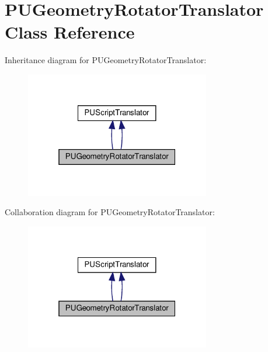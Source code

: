 \hypertarget{classPUGeometryRotatorTranslator}{}\section{P\+U\+Geometry\+Rotator\+Translator Class Reference}
\label{classPUGeometryRotatorTranslator}


Inheritance diagram for P\+U\+Geometry\+Rotator\+Translator\+:
\nopagebreak
\begin{figure}[H]
\begin{center}
\leavevmode
\includegraphics[width=229pt]{classPUGeometryRotatorTranslator__inherit__graph}
\end{center}
\end{figure}


Collaboration diagram for P\+U\+Geometry\+Rotator\+Translator\+:
\nopagebreak
\begin{figure}[H]
\begin{center}
\leavevmode
\includegraphics[width=229pt]{classPUGeometryRotatorTranslator__coll__graph}
\end{center}
\end{figure}
